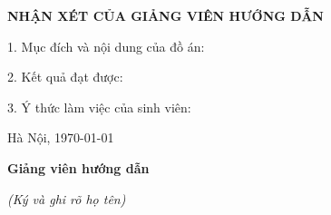 \newpage
\begin{center}
    {\bfseries NHẬN XÉT CỦA GIẢNG VIÊN HƯỚNG DẪN }
\end{center}  
1.	Mục đích và nội dung của đồ án:

\vspace{4ex} %

2.	Kết quả đạt được: 




3.	Ý thức làm việc của sinh viên:


 

Hà Nội, \today 

\textbf{Giảng viên hướng dẫn}   

\textit{(Ký và ghi rõ họ tên)}  





 
\newpage
